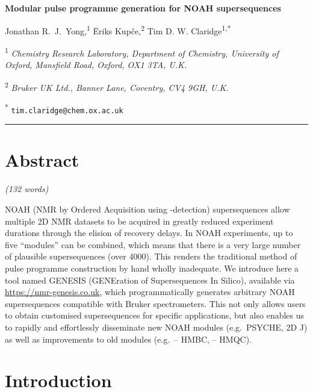 \documentclass[a4paper,11pt]{article}
\newcommand{\genesistitle}{Modular pulse programme generation for NOAH supersequences}
\newcommand{\crl}{Chemistry Research Laboratory, Department of Chemistry, University of Oxford, Mansfield Road, Oxford, OX1 3TA, U.K.}
\newcommand{\brukeruk}{Bruker UK Ltd., Banner Lane, Coventry, CV4 9GH, U.K.}
\newcommand{\proton}{\ch{^{1}H}}
\newcommand{\carbon}{\ch{^{13}C}}
\newcommand{\nitrogen}{\ch{^{15}N}}
\newcommand{\CH}{\carbon{}--\proton{}}
\newcommand{\NH}{\nitrogen{}--\proton{}}
\newcommand{\theurl}{\url{https://nmr-genesis.co.uk}}
\begin{document}
\begin{refsection}

\begin{center}   %
    \textbf{\Large \genesistitle{}}

    \vspace{0.2cm}

    Jonathan R.\ J.\ Yong,\textsuperscript{1} {\=E}riks Kup{\v{c}}e,\textsuperscript{2} Tim D. W. Claridge\textsuperscript{1,*}

    \vspace{0.2cm}

    \textsuperscript{1} \textit{\crl{}}

    \textsuperscript{2} \textit{\brukeruk{}}

    \textsuperscript{*} \texttt{tim.claridge@chem.ox.ac.uk}

    \vspace{0.5cm} \hrule
\end{center}

\section*{Abstract}

\textit{(132 words)}

NOAH (NMR by Ordered Acquisition using \proton{}-detection) supersequences allow multiple 2D NMR datasets to be acquired in greatly reduced experiment durations through the elision of recovery delays.
In NOAH experiments, up to five ``modules'' can be combined, which means that there is a very large number of plausible supersequences (over 4000).
This renders the traditional method of pulse programme construction by hand wholly inadequate.
We introduce here a tool named GENESIS (GENEration of Supersequences In Silico), available via \theurl{}, which programmatically generates arbitrary NOAH supersequences compatible with Bruker spectrometers.
This not only allows users to obtain customised supersequences for specific applications, but also enables us to rapidly and effortlessly disseminate new NOAH modules (e.g.\ PSYCHE, 2D J) as well as improvements to old modules (e.g.\ \CH{} HMBC, \NH{} HMQC).

\section{Introduction}


\end{refsection}
\end{document}
